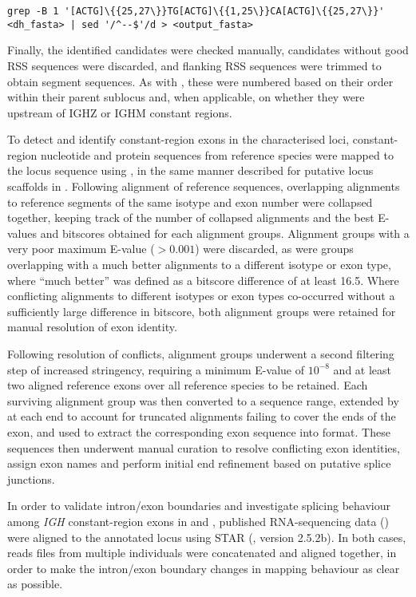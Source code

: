 \begin{lstlisting}
grep -B 1 '[ACTG]\{{25,27\}}TG[ACTG]\{{1,25\}}CA[ACTG]\{{25,27\}}' <dh_fasta> | sed '/^--$'/d > <output_fasta>
\end{lstlisting}

Finally, the identified \dh candidates were checked manually, candidates without good RSS sequences were discarded, and flanking RSS sequences were trimmed to obtain \dh segment sequences. As with \jh, these were numbered based on their order within their parent sublocus and, when applicable, on whether they were upstream of IGHZ or IGHM constant regions.


To detect and identify constant-region exons in the characterised loci, constant-region nucleotide and protein sequences from reference species were mapped to the locus sequence using  \parencite{altschul1990blast,altschul1997blast}, in the same manner described for putative locus scaffolds in .
Following alignment of reference sequences, overlapping alignments to reference segments of the same isotype and exon number were collapsed together, keeping track of the number of collapsed alignments and the best E-values and bitscores obtained for each alignment groups. Alignment groups with a very poor maximum E-value ($> 0.001$) were discarded, as were groups overlapping with a much better alignments to a different isotype or exon type, where ``much better'' was defined as a bitscore difference of at least 16.5. Where conflicting alignments to different isotypes or exon types co-occurred without a sufficiently large difference in bitscore, both alignment groups were retained for manual resolution of exon identity.

Following resolution of conflicts, alignment groups underwent a second filtering step of increased stringency, requiring a minimum E-value of $10^{-8}$ and at least two aligned reference exons over all reference species to be retained. Each surviving alignment group was then converted to a sequence range, extended by  at each end to account for truncated alignments failing to cover the ends of the exon, and used to extract the corresponding exon sequence into  format. These sequences then underwent manual curation to resolve conflicting exon identities, assign exon names and perform initial end refinement based on putative splice junctions.

In order to validate intron/exon boundaries and investigate splicing behaviour among \textit{IGH} constant-region exons in \Nfu and \Xma, published RNA-sequencing data () were aligned to the annotated locus using STAR (\parencite{dobin2013star}, version 2.5.2b). In both cases, reads files from multiple individuals were concatenated and aligned together, in order to make the intron/exon boundary changes in mapping behaviour as clear as possible. %

